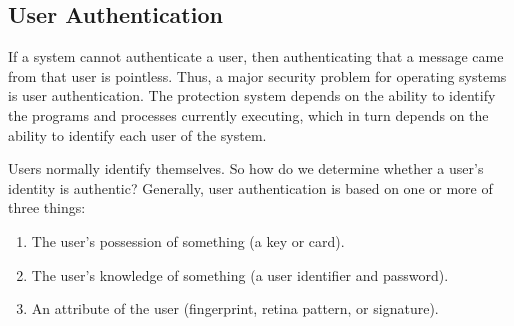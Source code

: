 \subsection{User Authentication}\label{subsec:User_Authentication}
If a system cannot authenticate a user, then authenticating that a message came from that user is pointless.
Thus, a major security problem for operating systems is user authentication.
The protection system depends on the ability to identify the programs and processes currently executing, which in turn depends on the ability to identify each user of the system.

Users normally identify themselves.
So how do we determine whether a user’s identity is authentic?
Generally, user authentication is based on one or more of three things:
\begin{enumerate}[noitemsep]
\item The user’s possession of something (a key or card).
\item The user’s knowledge of something (a user identifier and password).
\item An attribute of the user (fingerprint, retina pattern, or signature).
\end{enumerate}


